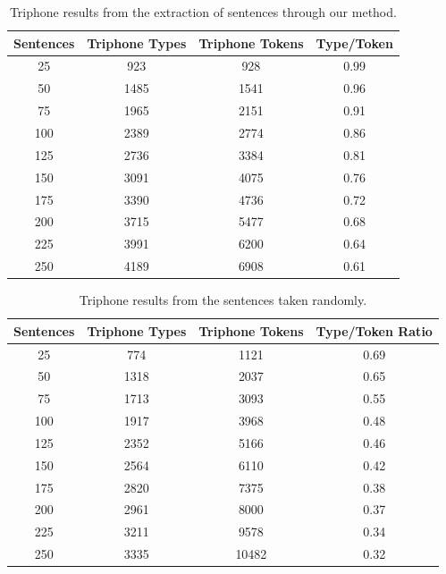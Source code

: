 \begin{table}[H]
\begin{center}
\begin{tabular}{|c|c|c|c|}
\hline
Sentences & Triphone Types & Triphone Tokens & Type/Token \\ \hline
25 & 923 & 928 & 0.99 \\
50 & 1485 & 1541 & 0.96 \\
75 & 1965 & 2151 & 0.91 \\
100 & 2389 & 2774 & 0.86 \\
125 & 2736 & 3384 & 0.81 \\
150 & 3091 & 4075 & 0.76 \\
175 & 3390 & 4736 & 0.72 \\
200 & 3715 & 5477 & 0.68 \\
225 & 3991 & 6200 & 0.64 \\
250 & 4189 & 6908 & 0.61 \\ \hline
\end{tabular}
\end{center}
\caption{\label{results-tri-extracted} Triphone results from the extraction of sentences through our method.}
\end{table}

\begin{table}[H]
\begin{center}
\begin{tabular}{|c|c|c|c|}
\hline
Sentences & Triphone Types & Triphone Tokens & Type/Token Ratio \\ \hline
25 & 774 & 1121 & 0.69 \\
50 & 1318 & 2037 & 0.65 \\ 
75 & 1713 & 3093 & 0.55 \\ 
100 & 1917 & 3968 & 0.48 \\ 
125 & 2352 & 5166 & 0.46 \\ 
150 & 2564 & 6110 & 0.42 \\ 
175 & 2820 & 7375 & 0.38 \\ 
200 & 2961 & 8000 & 0.37 \\ 
225 & 3211 & 9578 & 0.34 \\ 
250 & 3335 & 10482 & 0.32 \\ \hline
\end{tabular}
\end{center}
\caption{\label{results-tri-random} Triphone results from the sentences taken randomly.}
\end{table}

